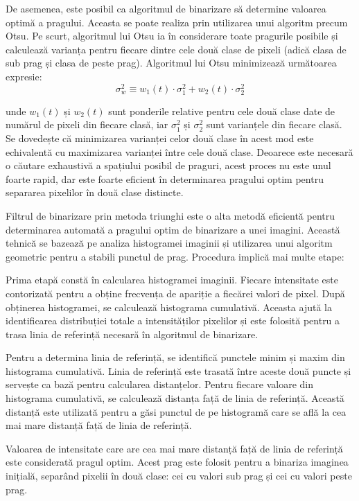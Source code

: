 De asemenea, este posibil ca algoritmul de binarizare să determine valoarea optimă a pragului. Aceasta se poate realiza prin utilizarea unui algoritm precum Otsu. Pe scurt, algoritmul lui Otsu ia în considerare toate pragurile posibile și calculează varianța pentru fiecare dintre cele două clase de pixeli (adică clasa de sub prag și clasa de peste prag). Algoritmul lui Otsu minimizează următoarea expresie:
\[
    \sigma_w^2 \equiv w_1(t) \cdot \sigma_1^2 + w_2(t) \cdot \sigma_2^2
\]

unde \( w_1(t) \) și \( w_2(t) \) sunt ponderile relative pentru cele două clase date de numărul de pixeli din fiecare clasă, iar \( \sigma_1^2 \) și \( \sigma_2^2 \) sunt varianțele din fiecare clasă. Se dovedește că minimizarea varianței celor două clase în acest mod este echivalentă cu maximizarea varianței între cele două clase. Deoarece este necesară o căutare exhaustivă a spațiului posibil de praguri, acest proces nu este unul foarte rapid, dar este foarte eficient în determinarea pragului optim pentru separarea pixelilor în două clase distincte.

Filtrul de binarizare prin metoda triunghi este o alta metodă eficientă pentru determinarea automată a pragului optim de binarizare a unei imagini. Această tehnică se bazează pe analiza histogramei imaginii și utilizarea unui algoritm geometric pentru a stabili punctul de prag. Procedura implică mai multe etape:

Prima etapă constă în calcularea histogramei imaginii. Fiecare intensitate este contorizată pentru a obține frecvența de apariție a fiecărei valori de pixel. După obținerea histogramei, se calculează histograma cumulativă. Aceasta ajută la identificarea distribuției totale a intensităților pixelilor și este folosită pentru a trasa linia de referință necesară în algoritmul de binarizare.

Pentru a determina linia de referință, se identifică punctele minim și maxim din histograma cumulativă. Linia de referință este trasată între aceste două puncte și servește ca bază pentru calcularea distanțelor. Pentru fiecare valoare din histograma cumulativă, se calculează distanța față de linia de referință. Această distanță este utilizată pentru a găsi punctul de pe histogramă care se află la cea mai mare distanță față de linia de referință.

Valoarea de intensitate care are cea mai mare distanță față de linia de referință este considerată pragul optim. Acest prag este folosit pentru a binariza imaginea inițială, separând pixelii în două clase: cei cu valori sub prag și cei cu valori peste prag.

